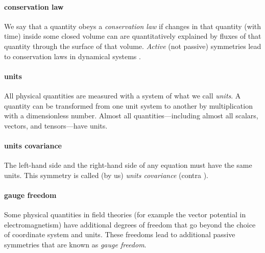\documentclass{article}
\theoremstyle{plain}
\theoremstyle{definition}
\theoremstyle{remark}
\begin{document}
\paragraph{conservation law}
We say that a quantity obeys a \emph{conservation law} if changes in that quantity (with time) inside some closed volume can are quantitatively explained by fluxes of that quantity through the surface of that volume.
\emph{Active} (not passive) symmetries lead to conservation laws in dynamical systems \cite{noether}.

\paragraph{units}
All physical quantities are measured with a system of what we call \emph{units}.
A quantity can be transformed from one unit system to another by multiplication with a dimensionless number.
Almost all quantities---including almost all scalars, vectors, and tensors---have units.

\paragraph{units covariance}
The left-hand side and the right-hand side of any equation must have the same units.
This symmetry is called (by us) \emph{units covariance} (contra \cite{villar2022dimensionless}).

\paragraph{gauge freedom}
Some physical quantities in field theories (for example the vector potential in electromagnetism) have additional degrees of freedom that go beyond the choice of coordinate system and units.
These freedoms lead to additional passive symmetries that are known as \emph{gauge freedom}.
\end{document}
